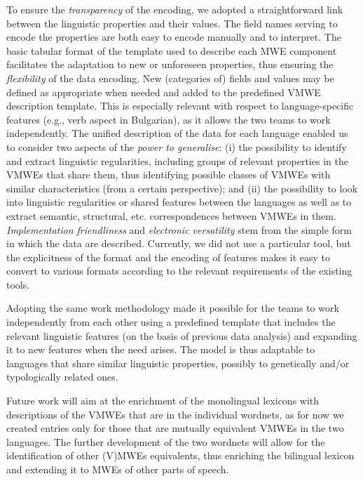 \documentclass[output=paper,colorlinks,citecolor=brown]{langscibook}
\begin{document}
To ensure the \textit{transparency} of the encoding, we adopted a straightforward link between the linguistic properties and their values. The field names serving to encode the properties %
are both easy to encode manually and to interpret. The basic tabular format of the template used to describe each MWE component facilitates the adaptation to new or unforeseen properties, %
thus ensuring the \textit{flexibility} of the data encoding. New (categories of) fields and values may be defined as appropriate when needed and added to the predefined VMWE description template. This is especially relevant with respect to language-specific features (e.g., verb aspect in Bulgarian), as it allows the two teams to work independently. The unified description of the data for each language enabled us to consider two aspects of the \textit{power to generalise}: %
(i) the possibility to identify and extract linguistic regularities, including groups of relevant properties in the VMWEs that share them, thus identifying possible classes of VMWEs with similar characteristics (from a certain perspective); and (ii) %
the possibility to look into linguistic regularities or shared features between the languages as well as to extract semantic, structural, etc. correspondences between VMWEs in them. %
\textit{Implementation friendliness} and \textit{electronic versatility} stem from the simple form in which the data are described. Currently, we did not use a particular tool, but the explicitness of the format and the encoding of features makes it easy to convert to various formats according to the relevant requirements of the existing tools.

Adopting the same work methodology made it possible for the teams to work independently from each other using a predefined template that includes the relevant linguistic features (on the basis of previous data analysis) and expanding it to new features when the need arises. The model is thus adaptable to languages that share similar linguistic properties, possibly to genetically and/or typologically related ones.  


Future work will aim at the enrichment of the monolingual lexicons with descriptions of the VMWEs that are in the individual wordnets, as for now we created entries only for those that are mutually equivalent VMWEs in the two languages. The further development of the two wordnets will allow for the identification of other (V)MWEs equivalents, thus enriching %
the bilingual lexicon and extending it to MWEs of other parts of speech.
\end{document}
